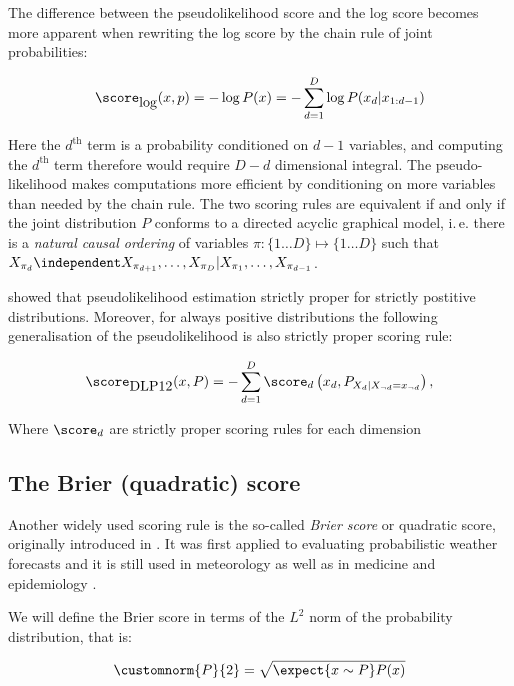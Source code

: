 The difference between the pseudolikelihood score and the log score becomes more apparent when rewriting the log score by the chain rule of joint probabilities:

\begin{equation}
	\score_{\mbox{log}}(x,p) = - \log P(x) =  - \sum_{d=1}^{D} \log P(x_d\vert x_{1:d-1})
\end{equation}

Here the $d^{\mbox{th}}$ term is a probability conditioned on $d-1$ variables, and computing the $d^{\mbox{th}}$ term therefore would require $D-d$ dimensional integral. The pseudo-likelihood makes computations more efficient by conditioning on more variables than needed by the chain rule. The two scoring rules are equivalent if and only if the joint distribution $P$ conforms to a directed acyclic graphical model, i.\,e. there is a \emph{natural causal ordering} of variables $\pi:\{1\ldots D\}\mapsto\{1\ldots D\}$ such that $X_{\pi_d}\independent X_{\pi_{d+1}},\ldots,X_{\pi_D} \vert X_{\pi_1},\ldots,X_{\pi_{d-1}}$. 

\citep{Csiszar2004} showed that pseudolikelihood estimation strictly proper for strictly postitive distributions. Moreover, for always positive distributions the following generalisation of the pseudolikelihood is also strictly proper scoring rule:

\begin{equation}
	\score_{\mbox{DLP12}}(x,P) = - \sum_{d=1}^{D} \score_d\left(x_d, P_{X_d \vert X_{\neg d}=x_{\neg d}}\right),
\end{equation}

Where $\score_d$ are strictly proper scoring rules for each dimension

\subsection{The Brier (quadratic) score}

Another widely used scoring rule is the so-called \emph{Brier score} or quadratic score, originally introduced in \citep{Brier1950}. It was first applied to evaluating probabilistic weather forecasts and it is still used in meteorology \citep{Ferro2007} as well as in medicine \citep{Spiegelhalter2006} and epidemiology \citep{Redelmeier1991}.

We will define the Brier score in terms of the $L^2$ norm of the probability distribution, that is:

\begin{equation}
	\customnorm{P}{2} = \sqrt{\expect{x \sim P} P(x)}
\end{equation}

